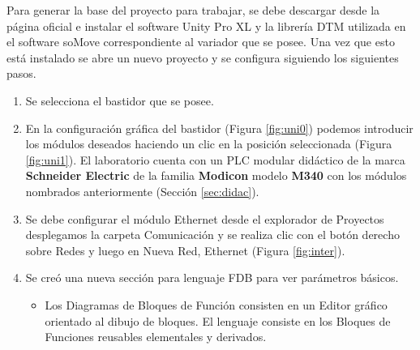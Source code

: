 Para generar la base del proyecto para trabajar, se debe descargar desde la página oficial e instalar el software Unity Pro XL y la librería DTM utilizada en el software soMove correspondiente al variador que se posee. Una vez que esto está instalado se abre un nuevo proyecto y se configura siguiendo los siguientes pasos.
\begin{enumerate}
	\item Se selecciona el bastidor que se posee.
	\item En la configuración gráfica del bastidor (Figura \ref{fig:uni0})
	podemos introducir los módulos
	deseados haciendo un clic en la
	posición seleccionada (Figura \ref{fig:uni1}).
	El laboratorio cuenta con un PLC modular didáctico de la marca \textbf{Schneider Electric} de la familia \textbf{Modicon} modelo \textbf{M340} con los módulos nombrados anteriormente (Sección \ref{sec:didac}). 
	\item Se debe configurar el módulo Ethernet desde el explorador de
	Proyectos desplegamos la
	carpeta Comunicación y se realiza clic con el botón derecho sobre Redes y luego en Nueva Red, Ethernet (Figura  \ref{fig:inter}).
	\item Se creó una nueva sección para lenguaje FDB para ver parámetros básicos.
	\begin{itemize}
		\item Los Diagramas de Bloques de Función consisten en un Editor gráfico orientado al dibujo
		de bloques. El lenguaje consiste en los Bloques de Funciones reusables elementales y
		derivados.
	\end{itemize}
\end{enumerate}
	

